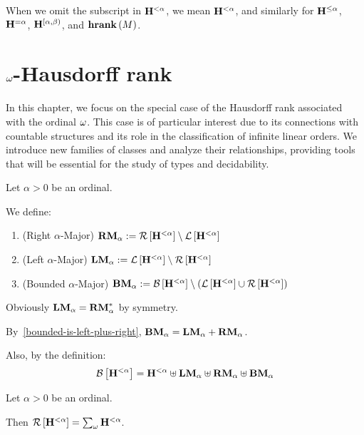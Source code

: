 \begin{notation}
  When we omit the subscript in $\mathbf{H}^{< \alpha}$,
  we mean $\mathbf{H}^{< \alpha}$,
  and similarly for $\mathbf{H}^{\le \alpha}$, $\mathbf{H}^{= \alpha}$, $\mathbf{H}^{[\alpha, \beta)}$,
  and $\mathbf{hrank} \left( {M} \right)$.
\end{notation}


\section{\texorpdfstring{$\omega$}{omega}-Hausdorff rank}

In this chapter, we focus on the special case of the Hausdorff rank associated with the ordinal $\omega$. This case is of particular interest due to its connections with countable structures and its role in the classification of infinite linear orders. We introduce new families of classes and analyze their relationships, providing tools that will be essential for the study of types and decidability.

\begin{definition}\label{bounded-definitions}
  Let $\alpha > 0$ be an ordinal.

  We define:
  \begin{enumerate}
    \item (Right $\alpha$-Major) $\mathbf{RM}_{\alpha} := \mathcal{R} \left[ {\mathbf{H}^{< \alpha}} \right] \setminus \mathcal{L} \left[ {\mathbf{H}^{< \alpha}} \right]$
    \item (Left $\alpha$-Major) $\mathbf{LM}_{\alpha} := \mathcal{L} \left[ {\mathbf{H}^{< \alpha}} \right] \setminus \mathcal{R} \left[ {\mathbf{H}^{< \alpha}} \right]$
    \item (Bounded $\alpha$-Major) $\mathbf{BM}_{\alpha} := \mathcal{B} \left[ {\mathbf{H}^{< \alpha}} \right] \setminus \left( { \mathcal{L} \left[ {\mathbf{H}^{< \alpha}} \right] \cup \mathcal{R} \left[ {\mathbf{H}^{< \alpha}} \right] } \right)$
  \end{enumerate}
\end{definition}

\begin{note}
  Obviously $\mathbf{LM}_{\alpha} = \mathbf{RM}_{\alpha}^\ast$ by symmetry.

  By~\cref{bounded-is-left-plus-right}, $\mathbf{BM}_{\alpha} = \mathbf{LM}_{\alpha} + \mathbf{RM}_{\alpha}$.

  Also, by the definition:
  \[
    \mathcal{B} \left[ {\mathbf{H}^{< \alpha}} \right] = \mathbf{H}^{< \alpha} \uplus \mathbf{LM}_{\alpha}
    \uplus \mathbf{RM}_{\alpha} \uplus \mathbf{BM}_{\alpha}
  \]
\end{note}

\begin{lemma}\label{bounded-structure}
  Let $\alpha > 0$ be an ordinal.

  Then $\mathcal{R} \left[ {\mathbf{H}^{< \alpha}} \right] = \sum_{\omega}{\mathbf{H}^{< \alpha}}$.
\end{lemma}

